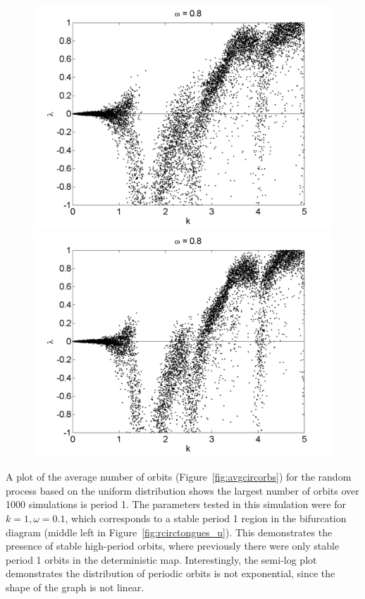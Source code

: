 \begin{figure}[!h]
\includegraphics[width=.5\textwidth]{figs/rcirc_u_lyap_10000_L_05_w_08_k.png}\hfill
\includegraphics[width=.5\textwidth]{figs/rcirc_u_lyap_10000_L_07_w_08_k.png}\\
\end{figure}

A plot of the average number of orbits
(Figure~\ref{fig:avgcircorbs}) for the random process based on the
uniform distribution shows the largest number of orbits over 1000
simulations is period 1. The parameters tested in this simulation were
for $k=1, \omega=0.1$, which corresponds to a stable period 1 region
in the bifurcation diagram (middle left in
Figure~\ref{fig:rcirctongues_u}). This demonstrates the presence of
stable high-period orbits, where previously there were only
stable period 1 orbits in the deterministic map. Interestingly, the
semi-log plot demonstrates the distribution of periodic orbits is not
exponential, since the shape of the graph is not linear.

